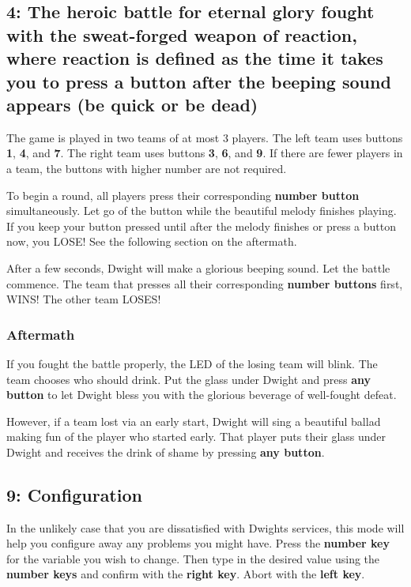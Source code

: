 \subsection*{4: The heroic battle for eternal glory fought with the sweat-forged weapon of reaction, where reaction is defined as the time it takes you to press a button after the beeping sound appears (be quick or be dead)}
The game is played in two teams of at most 3 players.
The left team uses buttons \textbf{1}, \textbf{4}, and \textbf{7}.
The right team uses buttons \textbf{3}, \textbf{6}, and \textbf{9}.
If there are fewer players in a team, the buttons with higher number are not required. 

To begin a round, all players press their corresponding \textbf{number button} simultaneously.
Let go of the button while the beautiful melody finishes playing.
If you keep your button pressed until after the melody finishes or press a button now, you LOSE! See the following section on the aftermath.

After a few seconds, Dwight will make a glorious beeping sound. Let the battle commence. The team that presses all their corresponding \textbf{number buttons} first, WINS! The other team LOSES!

\subsubsection*{Aftermath}
If you fought the battle properly, the LED of the losing team will blink. The team chooses who should drink. Put the glass under Dwight and press \textbf{any button} to let Dwight bless you with the glorious beverage of well-fought defeat.

However, if a team lost via an early start, Dwight will sing a beautiful ballad making fun of the player who started early. That player puts their glass under Dwight and receives the drink of shame by pressing \textbf{any button}.

\newpage
\subsection*{9: Configuration}
In the unlikely case that you are dissatisfied with Dwights services, this mode will help you configure away any problems you might have.
Press the \textbf{number key} for the variable you wish to change. Then type in the desired value using the \textbf{number keys} and confirm with the \textbf{right key}. Abort with the \textbf{left key}.

